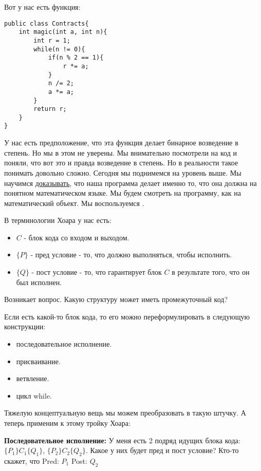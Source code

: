 
Вот у нас есть функция:

\begin{verbatim}
public class Contracts{
    int magic(int a, int n){
        int r = 1;
        while(n != 0){
            if(n % 2 == 1){
                r *= a;
            }
            n /= 2;
            a *= a;
        }
        return r;
    }
}
\end{verbatim}

У нас есть предположение, что эта функция делает бинарное возведение в степень. Но мы в этом не уверены. Мы внимательно посмотрели на код и поняли, что вот это и правда возведение в степень. Но в реальности такое понимать довольно сложно. Сегодня мы поднимемся на уровень выше. Мы научимся \uline{доказывать}, что наша программа делает именно то, что она должна на понятном математическом языке.
Мы будем смотреть на программу, как на математический объект. Мы воспользуемся .

В терминологии Хоара у нас есть:

\begin{itemize}
    \item  $C$ - блок кода со входом и выходом. 
    \item $\{ P \}$ - пред условие - то, что должно выполняться, чтобы исполнить.
    \item $\{ Q\}$ -  пост условие - то, что гарантирует блок $C$ в результате того, что он был исполнен.
\end{itemize}

Возникает вопрос. Какую структуру может иметь промежуточный код?


Если есть какой-то блок кода, то его можно переформулировать в следующую конструкции:
\begin{itemize}
    \item последовательное исполнение.
    \item присваивание.
    \item ветвление.
    \item цикл while.
\end{itemize}

Тяжелую концептуальную вещь мы можем преобразовать в такую штучку. А теперь применим к этому тройку Хоара:

\textbf{Последовательное исполнение:} У меня есть 2 подряд идущих блока кода: $\{ P_1 \} C_1 \{ Q_1\}$, $\{ P_2 \} C_2 \{ Q_2\}$. Какое у них будет пред и пост условие? Кто-то скажет, что
Pred: $P_1$ 
Post: $Q_2$

